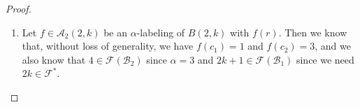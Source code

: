 \documentclass[10pt]{article}
\theoremstyle{definition}
\begin{document}
\begin{proof}
\begin{enumerate}
      \begin{align*}
        \mathcal{F}^*(\mathcal{B}_1) &= \{y + 1 - 1, \dots, 2k + 1 - 1\} \cup \{2k + 6 - y - 1, \dots, y - 1\} \\
        &= \{y, \dots, 2k\} \cup \{2k + 5 - y, 2k + 7 - y, \dots, y - 1\},
      \end{align*}
      \begin{align*}
        \mathcal{F}^*(\mathcal{B}_2) &= \{4 - 3, 5 - 3, \dots, 2k + 5 - y - 3\} \cup \{2k + 7 - y - 3, \dots, y - 1 - 3\} \\
        &= \{1, 2, \dots, 2k + 2 - y\} \cup \{2k + 4 - y, 2k + 6 - y, \dots, y - 4\}
      \end{align*}
      and also, $f^*(r a_1) = y - 2$ and $f^*(r a_1) = 2k + 3 - y$. Thus, we have
      \begin{align*}
        \mathcal{F}^* &= \{y, \dots, 2k\} \cup \{2k + 5 - y, \dots, y - 1\} \cup \{1, 2, \dots, 2k + 2 - y\}\\ &\quad\;\cup \{2k + 4 - y, 2k + 6 - y, \dots, y - 4\} \cup \{y - 2, 2k + 3 - y\}\\
        &= \{y, \dots, 2k\} \cup \{2k + 3 - y, \dots, y - 1\} \cup \{1, 2, \dots, 2k + 2 - y\}\\ &\quad\;\cup \{2k + 4 - y, 2k + 6 - y, \dots, y - 2\} \\
        &= \{y, \dots, 2k\} \cup \{2k + 3 - y, 2k + 4 - y \dots, y - 1\} \cup \{1, 2, \dots, 2k + 2 - y\} \\
        &= \{1, 2, \dots, 2k\} = [2k]
      \end{align*}
      Finally, we know that the $\alpha$ inequality holds since $f(c_i) \le 3 < f(v)$ for all $v \in \mathcal{B}_i$ and $i = 1,2$, as well as $f(r) = 2 \le 3 < f(a_i)$ for $i = 1,2$. Thus, we have shown $\{f_y \mid k + 3 \le y \le 2k + 1\} \subseteq \mathcal{A}_2(2, k)$.

    \item Let $f \in \mathcal{A}_2(2,k)$ be an $\alpha$-labeling of $B(2,k)$ with $f(r)$. Then we know that, without loss of generality, we have $f(c_1) = 1$ and $f(c_2) = 3$, and we also know that $4 \in \mathcal{F}(\mathcal{B}_2)$ since $\alpha = 3$ and $2k + 1 \in \mathcal{F}(\mathcal{B}_1)$ since we need $2k \in \mathcal{F}^*$.


\end{enumerate}
\end{proof}
\end{document}
